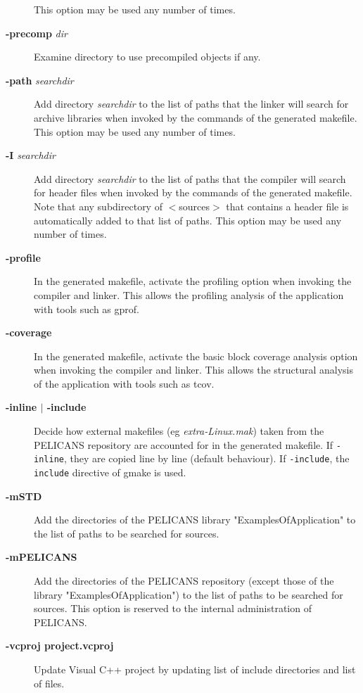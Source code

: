 \documentclass{article}
\begin{document}
\begin{description}
This option may be used any number of times.


\item[\textbf{-precomp} \emph{dir}] \mbox{}

Examine directory to use precompiled objects if any.


\item[\textbf{-path} \emph{searchdir}] \mbox{}

Add directory \emph{searchdir} to the list of paths that the linker
will search for archive libraries when invoked by the 
commands of the generated makefile. 
This option may be used any number of times.


\item[\textbf{-I} \emph{searchdir}] \mbox{}

Add directory \emph{searchdir} to the list of paths that the compiler will search
for header files when invoked by the commands of the generated
makefile. Note that any subdirectory of $<$sources$>$ that contains a header
file is automatically added to that list of paths.
This option may be used any number of times.


\item[\textbf{-profile}] \mbox{}

In the generated makefile, activate the profiling option
when invoking the compiler and linker.
This allows the profiling analysis of the application 
with tools such as gprof.


\item[\textbf{-coverage}] \mbox{}

In the generated makefile, activate the basic block coverage analysis option
when invoking the compiler and linker.
This allows the structural analysis of the application 
with tools such as tcov.


\item[\textbf{-inline $|$ -include}] \mbox{}

Decide how external makefiles (eg \emph{extra-Linux.mak}) taken from the PELICANS
repository are accounted for in the generated makefile.
If \texttt{-inline}, they are copied line by line  (default
behaviour). If \texttt{-include}, the \texttt{include} directive of gmake is used.


\item[\textbf{-mSTD}] \mbox{}

Add the directories of the PELICANS library "ExamplesOfApplication"
to the list of paths to be searched for sources.


\item[\textbf{-mPELICANS}] \mbox{}

Add the directories of the PELICANS repository (except
those of the library "ExamplesOfApplication") to the list
of paths to be searched for sources. This option is
reserved to the internal administration of PELICANS.


\item[\textbf{-vcproj project.vcproj}] \mbox{}

Update Visual C++ project by updating list of include directories
and list of files.

\end{description}
\end{document}

